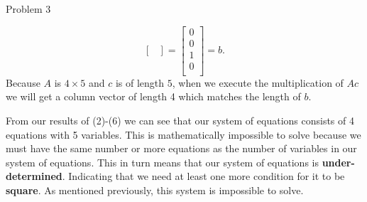 \begin{problem}{Problem 3}
\begin{highlight}[Solution]
\begin{equation}
\begin{bmatrix}
            \end{bmatrix}
            = 
            \begin{bmatrix}
                0 \\
                0 \\
                1 \\
                0 \\
            \end{bmatrix}
            = b.
        \end{equation}
        Because $A$ is $4 \times 5$ and $c$ is of length $5$, when we execute the multiplication of $Ac$ we will get a column vector of length 4 which matches the length of $b$.

        From our results of (2)-(6) we can see that our system of equations consists of 4 equations with 5 variables. This is mathematically impossible to solve because we must have the same number or 
        more equations as the number of variables in our system of equations. This in turn means that our system of equations is \textbf{under-determined}. Indicating that we need at least one more 
        condition for it to be \textbf{square}. As mentioned previously, this system is impossible to solve.
    \end{highlight}
\end{problem}


